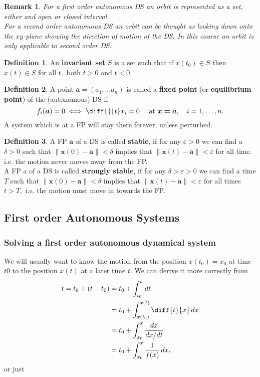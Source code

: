 \documentclass[12pt, a4paper]{article}
\newcommand{\f}[2]{\frac{#1}{#2}}
\newtheorem*{remark}{Remark}
\theoremstyle{definition}
\newtheorem{definition}{Definition}[section]
\theoremstyle{plain}
\begin{document}
\begin{remark}
For a first order autonomous DS an orbit is represented as a set, either and open or closed interval.\\
For a second order autonomous DS an orbit can be thought as looking down onto the $xy$-plane showing the direction of motion of the DS. In this course an orbit is only applicable to second order DS.
\end{remark}

\begin{definition}
An \textbf{invariant set} $S$ is a set such that if $x(t_0) \in S$ then $x(t) \in S$ for all $t,$ both $t > 0$ and $t < 0.$
\end{definition}

\begin{definition}
A point $\bm{a} = (a_1, \ldots a_n)$ is called a \textbf{fixed point} (or \textbf{equilibrium point}) of the (autonomous) DS if $$f_i(\bm{a})=0 \iff \diff{}{t}x_i=0 \quad \text{ at } \bm{x=a}, \quad i=1,\ldots,n.$$A system which is at a FP will stay there forever, unless perturbed.
\end{definition}

\begin{definition}
A FP $\bm{a}$ of a DS is called \textbf{stable}, if for any $\varepsilon > 0$ we can find a $\delta > 0$ such that $\|\bm{x}(0)-\bm{a}\| < \delta$
implies that $\|\bm{x}(t)-\bm{a}\|< \varepsilon$ for all time. i.e. the motion never moves away from the FP. \\ A FP a of a DS is called \textbf{strongly stable}, if for any $\delta > \varepsilon > 0$ we can find a time $T$ such that $\|\bm{x}(0)-\bm{a}\| < \delta$ implies that $\|\bm{x}(t)-\bm{a}\| < \varepsilon$ for all times $t > T,$ i.e. the motion must move in towards the FP.
\end{definition}

\subsection{First order Autonomous Systems}

\subsubsection{Solving a first order autonomous dynamical system}

We will usually want to know the motion from the position $x(t_0) = x_0$ at time $t0$ to the position $x(t)$ at a later time $t.$ We can derive it more correctly from 
$$\begin{aligned}
t=t_0+(t-t_0)&=t_0+\int_{t_0}^{t}\,dt\\
			&=t_0+\int_{x(t_0)}^{x(t)} \diff{t}{x}\,dx\\
			&=t_0+\int_{x_0}^{x} \frac{dx}{dx/dt}\\
			&=t_0+\int_{x_0}^{x} \f{1}{f(x)}\,dx, 
\end{aligned}$$ or just 
\end{document}
